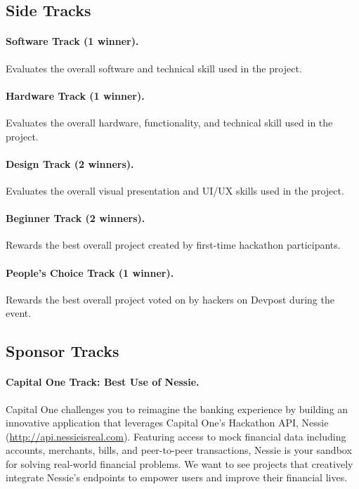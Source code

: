 \documentclass[11pt]{article}
\begin{document}
\subsection{Side Tracks}
\paragraph{Software Track (1 winner).}
Evaluates the overall software and technical skill used in the project.

\paragraph{Hardware Track (1 winner).}
Evaluates the overall hardware, functionality, and technical skill used in the project.

\paragraph{Design Track (2 winners).}
Evaluates the overall visual presentation and UI/UX skills used in the project.

\paragraph{Beginner Track (2 winners).}
Rewards the best overall project created by first-time hackathon participants.

\paragraph{People's Choice Track (1 winner).}
Rewards the best overall project voted on by hackers on Devpost during the event.

\subsection{Sponsor Tracks}
\paragraph{Capital One Track: Best Use of Nessie.}
Capital One challenges you to reimagine the banking experience by building an
innovative application that leverages Capital One's Hackathon API, Nessie
(\url{http://api.nessieisreal.com}). Featuring access to mock financial data
including accounts, merchants, bills, and peer-to-peer transactions, Nessie is
your sandbox for solving real-world financial problems. We want to see projects
that creatively integrate Nessie's endpoints to empower users and improve their
financial lives.
\end{document}
